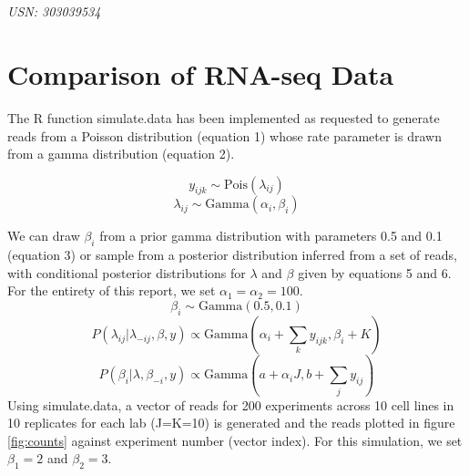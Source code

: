 \documentclass{article}
\begin{document}

\begin{center}
\textbf{\Large{}}\\
~\\
\textit{USN: 303039534}
\end{center}


\section{Comparison of RNA-seq Data}

The R function simulate.data has been implemented as requested to generate reads from a Poisson distribution (equation 1) whose rate parameter is drawn from a gamma distribution (equation 2).

\begin{equation}
y_{ijk} \sim \text{Pois}(\lambda_{ij})
\end{equation}
\begin{equation}
\lambda_{ij} \sim \text{Gamma}(\alpha_i, \beta_i)
\end{equation}

We can draw $\beta_i$ from a prior gamma distribution with parameters 0.5 and 0.1 (equation 3) or sample from a posterior distribution inferred from a set of reads, with conditional posterior distributions for $\lambda$ and $\beta$ given by equations 5 and 6. For the entirety of this report, we set $\alpha_1 = \alpha_2=100$.
\begin{equation}
\beta_i \sim \text{Gamma}(0.5, 0.1)
\end{equation}
\begin{equation}\tag{5}
P(\lambda_{ij} | \lambda_{-ij},\beta,y) \propto \text{Gamma}(\alpha_i + \sum_k{y_{ijk}}, \beta_i + K)
\end{equation}
\begin{equation}\tag{6}
P(\beta_i | \lambda,\beta_{-i},y) \propto \text{Gamma}(a+\alpha_i J, b+\sum_j{y_{ij}})
\end{equation}
Using simulate.data, a vector of reads for 200 experiments across 10 cell lines in 10 replicates for each lab (J=K=10) is generated and the reads plotted in figure \ref{fig:counts} against experiment number (vector index). For this simulation, we set $\beta_1 = 2$ and $\beta_2 = 3$.
\end{document}

